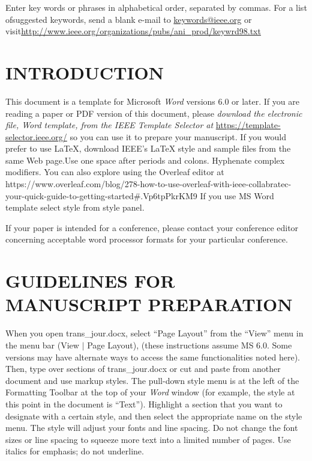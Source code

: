 \documentclass{IEEEojcsys}
\begin{document}
\begin{IEEEkeywords}
Enter key words or phrases in alphabetical order, separated by commas. For a list of\goodbreak suggested keywords, send a blank e-mail to \href{mailto:keywords@ieee.org}{keywords@ieee.org} or visit\goodbreak \href{http://www.ieee.org/organizations/pubs/ani_prod/keywrd98.txt}{http://www.ieee.org/organizations/pubs/ani\_prod/keywrd98.txt}
\end{IEEEkeywords}

\maketitle

\section{INTRODUCTION}

This document is a template for Microsoft {\it Word} versions 6.0 or later. If you are reading a paper or PDF version of this document, please {\it download the electronic file, Word template, from the IEEE Template Selector at} \underline{https://template-selector.ieee.org/} so you can use it to prepare your manuscript. If you would prefer to use LaTeX, download IEEE's LaTeX style and sample files from the same Web page.Use one space after periods and colons.   Hyphenate   complex   modifiers. You can also explore using the Overleaf editor at https://www.overleaf.com/blog/278-how-to-use-overleaf-with-ieee-collabratec-your-quick-guide-to-getting-started\#.Vp6tpPkrKM9 If you  use  MS  Word  template select style from style panel.

If your paper is intended for a conference, please contact your conference editor concerning acceptable word processor formats for your particular conference.\vspace*{-1pt}

\section{GUIDELINES FOR MANUSCRIPT PREPARATION}

When you open trans\_jour.docx, select ``Page Layout'' from the ``View'' menu in the menu bar (View $|$ Page Layout), (these instructions assume MS 6.0. Some versions may have alternate ways to access the same functionalities noted here). Then, type over sections of trans\_jour.docx or cut and paste from another document and use markup styles. The pull-down style menu is at the left of the Formatting Toolbar at the top of your {\it Word} window (for example, the style at this point in the document is ``Text''). Highlight a section\vadjust{\vfill\pagebreak} that you want to designate with a certain style, and then select the appropriate name on the style menu. The style will adjust your fonts and line spacing. Do not change the font sizes or line spacing to squeeze more text into a limited number of pages. Use italics for emphasis; do not underline.
\end{document}
